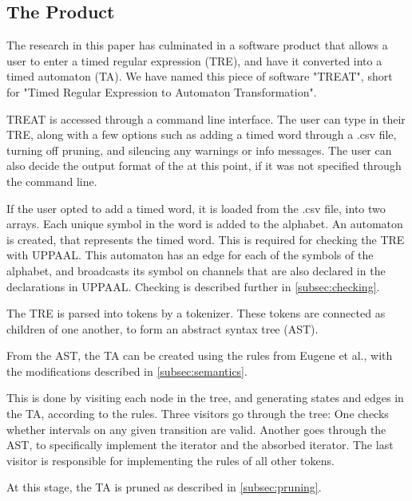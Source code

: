 \subsection{The Product}\label{subsec:theProduct}
The research in this paper has culminated in a software product that allows a user to enter a timed regular expression (TRE), and have it converted into a timed automaton (TA).
We have named this piece of software "TREAT", short for "Timed Regular Expression to Automaton Transformation".

TREAT is accessed through a command line interface. The user can type in their TRE, along with a few options such as adding a timed word through a .csv file, turning off pruning, and silencing any warnings or info messages.
The user can also decide the output format of the at this point, if it was not specified through the command line.

If the user opted to add a timed word, it is loaded from the .csv file, into two arrays. Each unique symbol in the word is added to the alphabet.
An automaton is created, that represents the timed word. This is required for checking the TRE with UPPAAL. This automaton has an edge for each of the symbols of the alphabet, and broadcasts its symbol on channels that are also declared in the declarations in UPPAAL. Checking is described further in \cref{subsec:checking}.

The TRE is parsed into tokens by a tokenizer. These tokens are connected as children of one another, to form an abstract syntax tree (AST). 

From the AST, the TA can be created using the rules from Eugene et al., with the modifications described in \cref{subsec:semantics}.

This is done by visiting each node in the tree, and generating states and edges in the TA, according to the rules. Three visitors go through the tree: One checks whether intervals on any given transition are valid. Another goes through the AST, to specifically implement the iterator and the absorbed iterator. The last visitor is responsible for implementing the rules of all other tokens.

At this stage, the TA is pruned as described in \cref{subsec:pruning}. 

